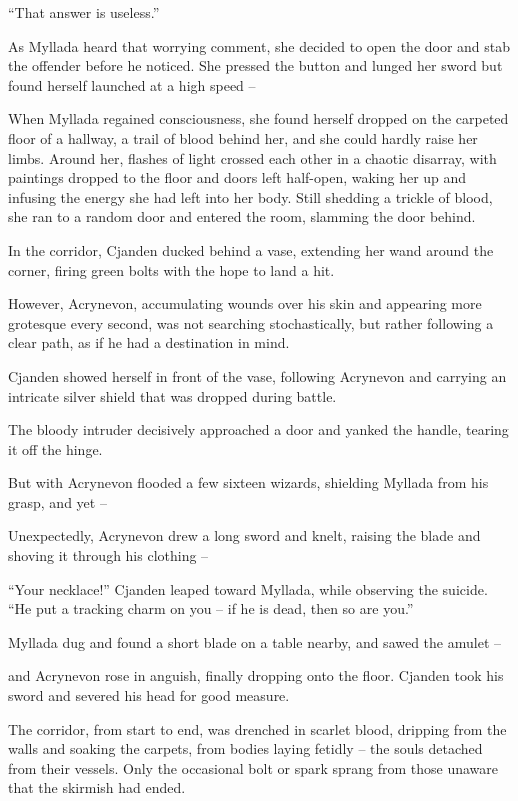 ``That answer is useless.''

As Myllada heard that worrying comment, she decided to open the door and stab the offender before he noticed. She pressed the button and lunged her sword but found herself launched at a high speed --

\centeredstars

When Myllada regained consciousness, she found herself dropped on the carpeted floor of a hallway, a trail of blood behind her, and she could hardly raise her limbs. Around her, flashes of light crossed each other in a chaotic disarray, with paintings dropped to the floor and doors left half-open, waking her up and infusing the energy she had left into her body. Still shedding a trickle of blood, she ran to a random door and entered the room, slamming the door behind.

In the corridor, Cjanden ducked behind a vase, extending her wand around the corner, firing green bolts with the hope to land a hit.

However, Acrynevon, accumulating wounds over his skin and appearing more grotesque every second, was not searching stochastically, but rather following a clear path, as if he had a destination in mind.

Cjanden showed herself in front of the vase, following Acrynevon and carrying an intricate silver shield that was dropped during battle.

The bloody intruder decisively approached a door and yanked the handle, tearing it off the hinge.

But with Acrynevon flooded a few sixteen wizards, shielding Myllada from his grasp, and yet --

Unexpectedly, Acrynevon drew a long sword and knelt, raising the blade and shoving it through his clothing --

``Your necklace!'' Cjanden leaped toward Myllada, while observing the suicide. ``He put a tracking charm on you -- if he is dead, then so are you.''

Myllada dug and found a short blade on a table nearby, and sawed the amulet --

and Acrynevon rose in anguish, finally dropping onto the floor. Cjanden took his sword and severed his head for good measure.

The corridor, from start to end, was drenched in scarlet blood, dripping from the walls and soaking the carpets, from bodies laying fetidly -- the souls detached from their vessels. Only the occasional bolt or spark sprang from those unaware that the skirmish had ended.

